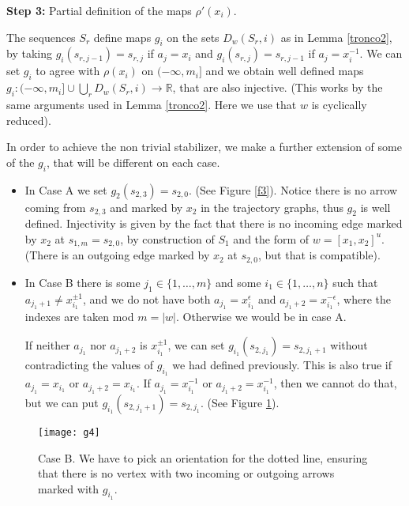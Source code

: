 \documentclass[12pt]{article}
\newcommand{\R}{\mathbb{R}}
\theoremstyle{definition}
\newcommand{\vs}{\vspace{0.3cm}}
\begin{document}
\vs
{\flushleft \bf Step 3:} Partial definition of the maps $\rho'(x_i)$.
\vs

The sequences $S_r$ define maps $g_i$ on the sets $D_w(S_r,i)$ as in Lemma \ref{tronco2}, by taking $g_i(s_{r,j-1})=s_{r,j}$ if $a_j=x_i$ and $g_i(s_{r,j})=s_{r,j-1}$ if $a_j=x_i^{-1}$. We can set $g_i$ to agree with $\rho(x_i)$ on $(-\infty,m_i]$ and we obtain well defined maps $g_i:(-\infty,m_i]\cup\bigcup_r D_w(S_r,i)\to\R$, that are also injective. (This works by the same arguments used in Lemma \ref{tronco2}. Here we use that $w$ is cyclically reduced).

In order to achieve the non trivial stabilizer, we make a further extension of some of the $g_i$, that will be different on each case. 
  
\begin{itemize}
\item In Case A we set $g_2(s_{2,3})=s_{2,0}$. (See Figure \ref{f3}). Notice there is no arrow coming from $s_{2,3}$ and marked by $x_2$ in the trajectory graphs, thus $g_2$ is well defined. Injectivity is given by the fact that there is no incoming edge marked by $x_2$ at $s_{1,m}=s_{2,0}$, by construction of $S_1$ and the form of $w=[x_1,x_2]^u$. (There is an outgoing edge marked by $x_2$ at $s_{2,0}$, but that is compatible).
\item In Case B there is some $j_1\in\{1,\ldots,m\}$ and some $i_1\in\{1,\ldots,n\}$ such that $a_{j_1+1} \neq x_{i_1}^{\pm 1} $, and we do not have both $a_{j_1}=x_{i_1}^{\epsilon}$ and $a_{j_1+2}= x_{i_1}^{-\epsilon}$, where the indexes are taken mod $m=|w|$. Otherwise we would be in case A.   

If neither $a_{j_1}$ nor $a_{j_1+2}$ is $x_{i_1}^{\pm 1}$, we can set $g_{i_1}(s_{2,j_1})=s_{2,j_1+1}$ without contradicting the values of $g_{i_1}$ we had defined previously. This is also true if $a_{j_1} = x_{i_1}$ or $a_{j_1+2}= x_{i_1}$.   
If $a_{j_1}=x_{i_1}^{-1}$ or $a_{j_1+2}=x_{i_1}^{-1}$, then we cannot do that, but we can put $g_{i_1}(s_{2,j_1+1})=s_{2,j_1}$. (See Figure \ref{f4}).

\end{itemize}

\begin{figure}[h!] 
\centering
\texttt{[image: g4]}
\caption{Case B. We have to pick an orientation for the dotted line, ensuring that there is no vertex with two incoming or outgoing arrows marked with $g_{i_1}$.}
\label{f4}
\end{figure}
\end{document}
